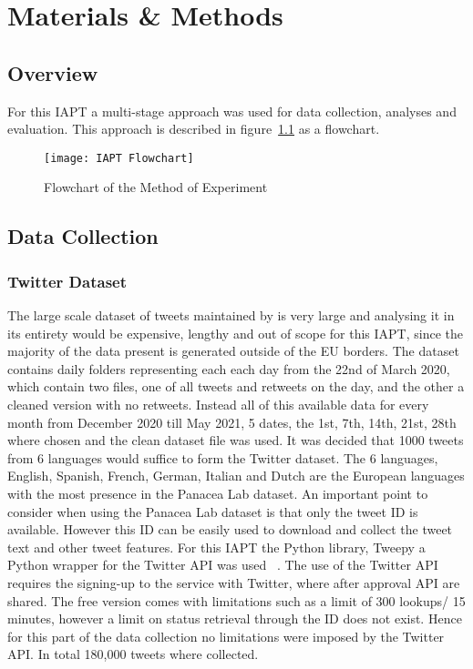 \chapter{Materials \& Methods}

\section{Overview}

For this \ac{IAPT} a multi-stage approach was used for data collection, analyses and evaluation.
This approach is described in figure~\ref{fig:flowchart} as a flowchart.

\begin{figure}[h!]
\texttt{[image: IAPT Flowchart]}
\caption[Method Flowchart]{Flowchart of the Method of Experiment}
\label{fig:flowchart}
\end{figure}

\section{Data Collection}

\subsection{Twitter Dataset}

The large scale dataset of tweets maintained by \citet{banda2020largescale} is very large and analysing it in its entirety would be expensive, lengthy and out of scope for this \ac{IAPT}, since the majority of the data present is generated outside of the \ac{EU} borders.
The dataset contains daily folders representing each each day from the 22nd of March 2020, which contain two files, one of all tweets and retweets on the day, and the other a cleaned version with no retweets.
Instead all of this available data for every month from December 2020 till May 2021, 5 dates, the 1st, 7th, 14th, 21st, 28th where chosen and the clean dataset file was used.
It was decided that 1000 tweets from 6 languages would suffice to form the Twitter dataset.
The 6 languages, English, Spanish, French, German, Italian and Dutch are the European languages with the most presence in the Panacea Lab dataset.
An important point to consider when using the Panacea Lab dataset is that only the tweet ID is available.
However this ID can be easily used to download and collect the tweet text and other tweet features.
For this \ac{IAPT} the Python library, Tweepy a Python wrapper for the Twitter \ac{API} was used ~\citep{roesslein2020tweepy}.
The use of the Twitter \ac{API} requires the signing-up to the service with Twitter, where after approval \ac{API} are shared.
The free version comes with limitations such as a limit of 300 lookups/ 15 minutes, however a limit on status retrieval through the ID does not exist.
Hence for this part of the data collection no limitations were imposed by the Twitter \ac{API}.
In total 180,000 tweets where collected.

